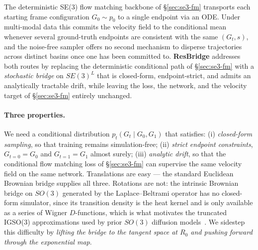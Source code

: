\documentclass{article}
\begin{document}
The deterministic SE(3) flow matching backbone of \S\ref{sec:se3-fm} transports each starting frame configuration $G_0\!\sim\!p_0$ to a single endpoint via an ODE. Under multi-modal data this commits the velocity field to the conditional mean whenever several ground-truth endpoints are consistent with the same $(G_t,s)$, and the noise-free sampler offers no second mechanism to disperse trajectories across distinct basins once one has been committed to. \textbf{ResBridge} addresses both routes by replacing the deterministic conditional path of \S\ref{sec:se3-fm} with a \emph{stochastic bridge} on $SE(3)^L$ that is closed-form, endpoint-strict, and admits an analytically tractable drift, while leaving the loss, the network, and the velocity target of \S\ref{sec:se3-fm} entirely unchanged.

\paragraph{Three properties.}
We need a conditional distribution $p_t(G_t\!\mid\!G_0,G_1)$ that satisfies:
(i) \emph{closed-form sampling}, so that training remains simulation-free;
(ii) \emph{strict endpoint constraints}, $G_{t=0}\!=\!G_0$ and $G_{t=1}\!=\!G_1$ almost surely;
(iii) \emph{analytic drift}, so that the conditional flow matching loss of \S\ref{sec:se3-fm} can supervise the same velocity field on the same network.
Translations are easy --- the standard Euclidean Brownian bridge supplies all three. Rotations are not: the intrinsic Brownian bridge on $SO(3)$ generated by the Laplace--Beltrami operator has no closed-form simulator, since its transition density is the heat kernel and is only available as a series of Wigner $D$-functions, which is what motivates the truncated IGSO(3) approximations used by prior $SO(3)$ diffusion models~\cite{leach2022denoising,yim2023se}. We sidestep this difficulty by \emph{lifting the bridge to the tangent space at $R_0$ and pushing forward through the exponential map}.
\end{document}
